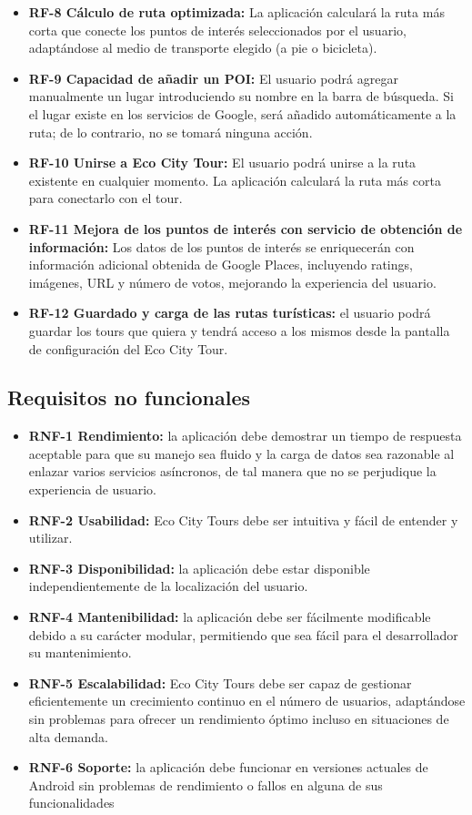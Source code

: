 \begin{itemize}
	\item \textbf{RF-8 Cálculo de ruta optimizada:} La aplicación calculará la ruta más corta que conecte los puntos de interés seleccionados por el usuario, adaptándose al medio de transporte elegido (a pie o bicicleta).
	
	\item \textbf{RF-9 Capacidad de añadir un POI:} El usuario podrá agregar manualmente un lugar introduciendo su nombre en la barra de búsqueda. Si el lugar existe en los servicios de Google, será añadido automáticamente a la ruta; de lo contrario, no se tomará ninguna acción.
	
	\item \textbf{RF-10 Unirse a Eco City Tour:} El usuario podrá unirse a la ruta existente en cualquier momento. La aplicación calculará la ruta más corta para conectarlo con el tour.
	
	\item \textbf{RF-11 Mejora de los puntos de interés con servicio de obtención de información:} Los datos de los puntos de interés se enriquecerán con información adicional obtenida de Google Places, incluyendo ratings, imágenes, URL y número de votos, mejorando la experiencia del usuario.
	
	\item \textbf{RF-12 Guardado y carga de las rutas turísticas:} el usuario podrá guardar los tours que quiera y tendrá acceso a los mismos desde la pantalla de configuración del Eco City Tour.
	
\end{itemize}

\subsection{Requisitos no funcionales}
\begin{itemize}
	\item \textbf{RNF-1 Rendimiento:} la aplicación debe demostrar un tiempo de respuesta aceptable para que su manejo sea fluido y la carga de datos sea razonable al enlazar varios servicios asíncronos, de tal manera que no se perjudique la experiencia de usuario. 
	\item \textbf{RNF-2 Usabilidad:} Eco City Tours debe ser intuitiva y fácil de entender y utilizar.
	\item \textbf{RNF-3 Disponibilidad:} la aplicación debe estar disponible independientemente de la localización del usuario.
	\item \textbf{RNF-4 Mantenibilidad:} la aplicación debe ser fácilmente modificable debido a su carácter modular, permitiendo que sea fácil para el desarrollador su mantenimiento.
	\item \textbf{RNF-5 Escalabilidad:} Eco City Tours debe ser capaz de gestionar eficientemente un crecimiento continuo en el número de usuarios, adaptándose sin problemas para ofrecer un rendimiento óptimo incluso en situaciones de alta demanda.
	\item \textbf{RNF-6 Soporte:} la aplicación debe funcionar en versiones actuales de Android sin problemas de rendimiento o fallos en alguna de sus funcionalidades
\end{itemize}
\clearpage

